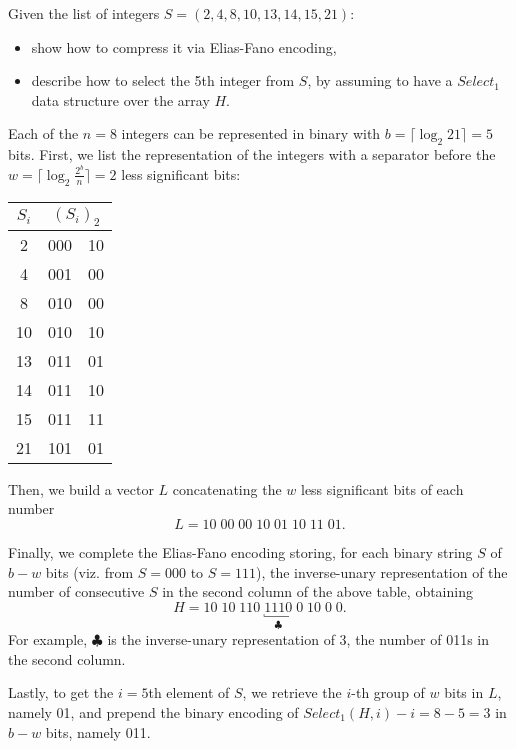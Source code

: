\exercise

Given the list of integers $S=(2,4,8,10,13,14,15,21)$:
%
\begin{itemize}
  \item show how to compress it via Elias-Fano encoding,
  \item describe how to select the 5th integer from $S$, by assuming to have a $Select_1$ data structure over the array $H$.
\end{itemize}

\solution
\label{09_posting_compression:elias}

Each of the $n=8$ integers can be represented in binary with $b=\lceil\log_2
21\rceil=5$ bits. First, we list the representation of the integers with a
separator before the $w=\lceil\log_2\frac{2^b}{n}\rceil=2$ less significant
bits:
%
\begin{center}
  \begin{tabular}{ c | r | l }
    $S_i$ & \multicolumn{2}{c}{$(S_i)_2$} \\ \hline
     2 & 000 & 10 \\
     4 & 001 & 00 \\
     8 & 010 & 00 \\
    10 & 010 & 10 \\
    13 & 011 & 01 \\
    14 & 011 & 10 \\
    15 & 011 & 11 \\
    21 & 101 & 01
  \end{tabular}
\end{center}
%
Then, we build a vector $L$ concatenating the $w$ less significant bits of each
number
%
$$L = 10\; 00\; 00\; 10\; 01\; 10\; 11\; 01.$$

Finally, we complete the Elias-Fano encoding storing, for each binary string $S$
of $b-w$ bits (viz. from $S=000$ to $S=111$), the inverse-unary representation
of the number of consecutive $S$ in the second column of the above table,
obtaining
%
$$H=10\;10\;110\;\underbracket{1110}_{\clubsuit}\;0\;10\;0\;0.$$
%
For example, $\clubsuit$ is the inverse-unary representation of 3, the number of
011s in the second column.

Lastly, to get the $i=5$th element of $S$, we retrieve the $i$-th group of $w$
bits in $L$, namely 01, and prepend the binary encoding of $Select_1(H,
i)-i=8-5=3$ in $b-w$ bits, namely 011.
